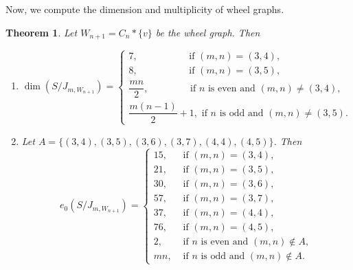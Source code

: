 \documentclass[12pt,reqno]{amsart}
\theoremstyle{plain}
\newtheorem{theorem}{Theorem}[section]
\theoremstyle{definition}
\begin{document}
Now, we compute the dimension and multiplicity of wheel graphs.
\begin{theorem}
    Let $W_{n+1}=C_n*\{v\}$ be the wheel graph. Then 
    \begin{enumerate}
        \item $$\dim(S/J_{m,W_{n+1}})=\begin{cases}
            7,\quad \qquad\qquad\text{ if $(m,n)=(3,4)$},\\
            8, \quad\qquad\qquad\text{ if $(m,n)=(3,5)$},\\
            \dfrac{mn}{2},\quad \quad \qquad \text{ if $n$ is even and $(m,n)\neq (3,4)$},\\
            \dfrac{m(n-1)}{2}+1, \text{ if $n$ is odd and $(m,n)\neq (3,5)$}.
        \end{cases}$$
        \item Let $A=\{(3,4),(3,5),(3,6),(3,7),(4,4),(4,5)\}$. Then $$e_0(S/J_{m,W_{n+1}})=
        \begin{cases}
            15, &\text{ if $(m,n)=(3,4)$},\\
            21, &\text{ if $(m,n)=(3,5)$},\\
            30, &\text{ if $(m,n)=(3,6)$},\\
            57, &\text{ if $(m,n)=(3,7)$},\\
            37, &\text{ if $(m,n)=(4,4)$},\\
            76, &\text{ if $(m,n)=(4,5)$},\\
            2, &\text{ if $n$ is even and $(m,n)\notin A$},\\
            mn, &\text{ if $n$ is odd and $(m,n)\notin A$}.
        \end{cases}$$
    \end{enumerate}
\end{theorem}
\end{document}
